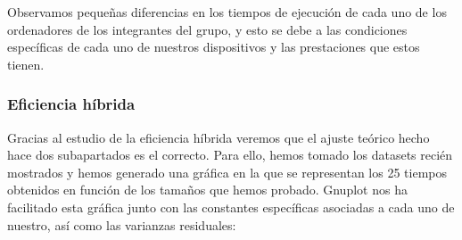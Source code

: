 \documentclass[10pt,a4paper]{article}
\begin{document}
\begin{table}[h!]
	\centering
	\footnotesize
	\hspace{2cm}
	\hspace{2cm}
	\caption{Experiencia empírica de algoritmo de Selección sin optimizar}
\end{table}

Observamos pequeñas diferencias en los tiempos de ejecución de cada uno de los ordenadores de los integrantes del grupo, y esto se debe a las condiciones específicas de cada uno de nuestros dispositivos y las prestaciones que estos tienen.

\subsubsection{Eficiencia híbrida}

Gracias al estudio de la eficiencia híbrida veremos que el ajuste teórico hecho hace dos subapartados es el correcto. Para ello, hemos tomado los datasets recién mostrados y hemos generado una gráfica en la que se representan los 25 tiempos obtenidos en función de los tamaños que hemos probado. Gnuplot nos ha facilitado esta gráfica junto con las constantes específicas asociadas a cada uno de nuestro, así como las varianzas residuales:
\end{document}
